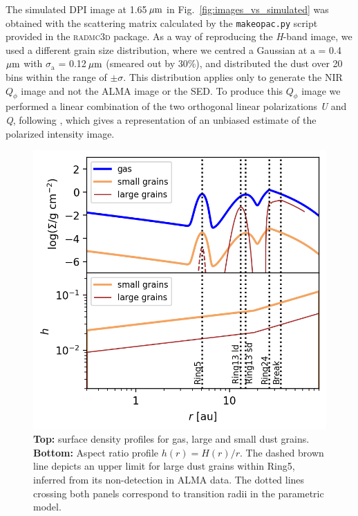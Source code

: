 \documentclass[fleqn,usenatbib,useAMS]{mnras}
\begin{document}
The simulated DPI image at 1.65\,$\hbox{$\mu$m}$ in Fig.~\ref{fig:images_vs_simulated} was obtained with the scattering matrix calculated by the {\tt makeopac.py} script provided in the \textsc{radmc3d} package. As a way of reproducing the \textit{H}-band image, we used a different grain size distribution, where we centred a Gaussian at $\mathrm{a}$ = 0.4\,$\hbox{$\mu$m}$ with $\sigma_{\mathrm{a}}$ = 0.12\,$\hbox{$\mu$m}$ (smeared out by 30\%), and distributed the dust over 20 bins within the range of $\pm \sigma$. This distribution applies only to generate the NIR $Q_\phi$ image and not the ALMA image or the SED. To produce this $Q_\phi$ image we performed a linear combination of the two orthogonal linear polarizations \textit{U} and \textit{Q}, following \citet{Avenhaus_2017}, which gives a representation of an unbiased estimate of the polarized intensity image.

\begin{figure}
	\includegraphics[width=\columnwidth]{allprofiles.png}
        \caption{{\bf Top:} surface density profiles for gas, large and small dust grains. {\bf Bottom:} Aspect ratio profile $h(r)= H(r)/r$. The dashed brown line depicts an upper limit for large dust grains within Ring5, inferred from its non-detection in ALMA data. The dotted lines crossing both panels correspond to transition radii in the parametric model.}
    \label{fig:profiles}
\end{figure}
\end{document}

